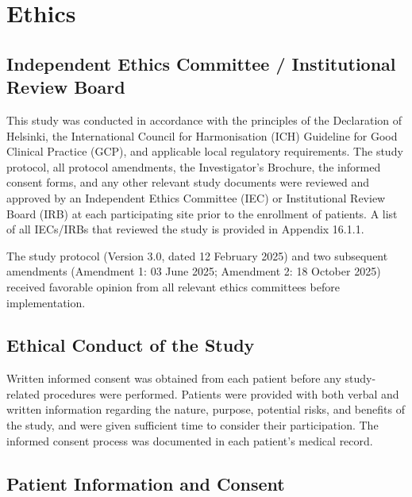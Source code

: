 \documentclass[11pt, a4paper]{article}
\begin{document}
\newpage

\section{Ethics}

\subsection{Independent Ethics Committee / Institutional Review Board}

This study was conducted in accordance with the principles of the Declaration of Helsinki, the International Council for Harmonisation (ICH) Guideline for Good Clinical Practice (GCP), and applicable local regulatory requirements. The study protocol, all protocol amendments, the Investigator's Brochure, the informed consent forms, and any other relevant study documents were reviewed and approved by an Independent Ethics Committee (IEC) or Institutional Review Board (IRB) at each participating site prior to the enrollment of patients. A list of all IECs/IRBs that reviewed the study is provided in Appendix 16.1.1.

\begin{notebox}
The study protocol (Version 3.0, dated 12 February 2025) and two subsequent amendments (Amendment 1: 03 June 2025; Amendment 2: 18 October 2025) received favorable opinion from all relevant ethics committees before implementation.
\end{notebox}

\subsection{Ethical Conduct of the Study}

Written informed consent was obtained from each patient before any study-related procedures were performed. Patients were provided with both verbal and written information regarding the nature, purpose, potential risks, and benefits of the study, and were given sufficient time to consider their participation. The informed consent process was documented in each patient's medical record.

\subsection{Patient Information and Consent}
\end{document}
